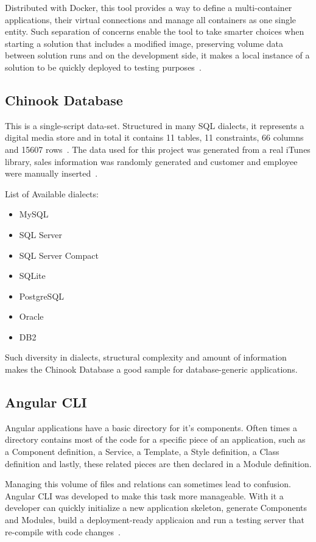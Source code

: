 Distributed with Docker, this tool provides a way to define a multi-container applications, their virtual connections and manage all containers as one single entity. Such separation of concerns enable the tool to take smarter choices when starting a solution that includes a modified image, preserving volume data between solution runs and on the development side, it makes a local instance of a solution to be quickly deployed to testing purposes~\cite{compose}. 

\subsection{Chinook Database}
This is a single-script data-set. Structured in many \gls{SQL} dialects, it represents a  digital media store and in total it contains 11 tables, 11 constraints, 66 columns and 15607 rows~\cite{schemaspy}. The data used for this project was generated from a real iTunes library, sales information was randomly generated and customer and employee were manually inserted~\cite{chinook}.

List of Available dialects:
\begin{itemize}
\item MySQL
\item SQL Server
\item SQL Server Compact
\item SQLite
\item PostgreSQL
\item Oracle
\item DB2
\end{itemize}

Such diversity in dialects, structural complexity and amount of information makes the Chinook Database a good sample for database-generic applications.

\subsection{Angular \gls{CLI}}
\label{angularcli}
Angular applications have a basic directory for it's components. Often times a directory contains most of the code for a specific piece of an application, such as a Component definition, a Service, a Template, a Style definition, a Class definition and lastly, these related pieces are then declared in a Module definition.

Managing this volume of files and relations can sometimes lead to confusion. Angular \gls{CLI} was developed to make this task more manageable. With it a developer can quickly initialize a new application skeleton, generate Components and Modules, build a deployment-ready applicaion and run a testing server that re-compile with code changes~\cite{angularcli}.

